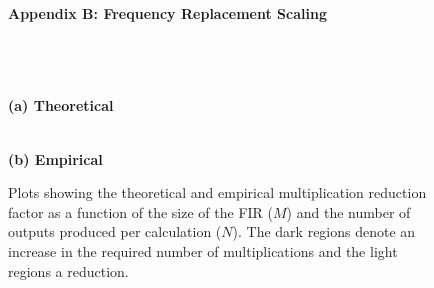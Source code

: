 \begin{figure*}[t]
\parbox{6in}{
\begin{center}
{\bf Appendix B:  Frequency Replacement Scaling} \\ ~ \\ ~ \\
\begin{minipage}{2.8 in}
\begin{center}
\epsfxsize=2.2in
 \\
{\bf (a) Theoretical}
\end{center}
\end{minipage} 
\begin{minipage}{2.8 in}
\begin{center}
\epsfxsize=2.2in
 \\
{\bf (b) Empirical}
\end{center}
\end{minipage}
\caption{Plots showing the theoretical and empirical multiplication reduction factor as a function of the size of the FIR ($M$) and the number of outputs produced per calculation ($N$). The dark regions denote an increase in the required number of multiplications and the light regions a reduction.}
\label{fig:frequency-win}
\end{center}

}
\end{figure*}
